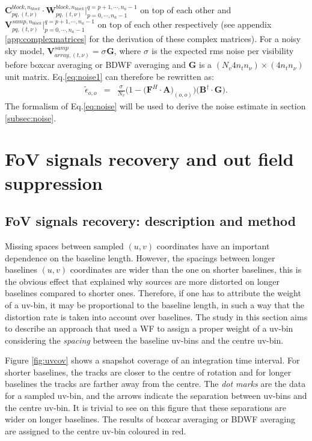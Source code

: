 \documentclass[useAMS,usenatbib]{mn2e}
\begin{document}
$\mathbf{C}_{pq,(t,\nu)}^{block,n_{block}}\cdot \mathbf{W}_{pq,(t,\nu)}^{block,n_{block}}\Big|_{p=0,\cdots,n_{a}-1}^{q=p+1,\cdots,n_{a}-1}$ 
on 
top of each other and $\mathbf{V}_{pq,(t,\nu)}^{samp,n_{block}}\Big|_{p=0,\cdots,n_{a}-1}^{q=p+1,\cdots,n_{a}-1}$ on top of each other 
respectively (see appendix \ref{app:complexmatrices} for the derivation of these complex matrices). For a noisy sky model, 
$\mathbf{V}_{array,(t, \nu)}^{ samp } =\sigma_{}\mathbf{G}$, 
where $\sigma_{}$ is the expected rms noise per visibility before boxcar averaging or BDWF averaging and $\mathbf{G}$ is a $(N_v 4 n_t 
n_{\nu}) \times (4 n_t n_{\nu})$ unit matrix. Eq.\ref{eq:noise1} can therefore be rewritten as:
\begin{eqnarray}
 \widetilde{\epsilon}_{o,o}		
&=&\frac{\sigma_{}}{N_{v}}\bigg(1-\Big(\mathbf{F}^{H}\cdot\mathbf{A}\Big)_{(o,o)}\bigg)\bigg(\mathbf{B}^{\dagger}\cdot\mathbf{G}
\bigg).\label{eq:noise}
\end{eqnarray}
The formalism of Eq.\ref{eq:noise} will be used to derive the noise estimate in section \ref{subsec:noise}.
\section{FoV signals recovery and out field suppression}
\subsection{FoV signals recovery: description and method}
\label{baseline1}
Missing spaces between sampled $(u,v)$ coordinates have an important dependence on the baseline length. However, the spacings between 
longer 
baselines $(u,v)$ coordinates are wider than the one on shorter baselines, this is the obvious effect that explained why sources are more 
distorted on longer baselines compared to shorter ones. Therefore, if one has to attribute the weight of a uv-bin, it may be proportional 
to 
the baseline length, in such a way that the distortion rate is taken into account over baselines. The study in this section aims to 
describe an approach that used a WF to assign a proper weight of a uv-bin considering the \textit{spacing} between the baseline uv-bins and 
the centre uv-bin.

Figure \ref{fig:uvcov} shows a snapshot coverage of an integration time interval. For shorter baselines, the tracks are closer to the 
centre 
of 
rotation and for longer baselines the tracks are farther away from the centre. The \textit{dot marks} are the data for a sampled uv-bin, 
and the  arrows indicate the separation between uv-bins and the centre uv-bin. It is trivial to see on this 
figure that these separations are wider on longer baselines. The results of boxcar averaging or BDWF averaging are assigned to the centre 
uv-bin coloured in red.
\end{document}
